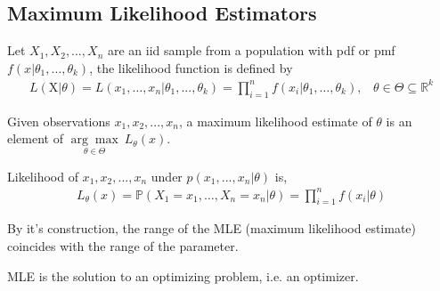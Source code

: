 \documentclass[a4paper,english,12pt]{article}
\begin{document}
\subsection{Maximum Likelihood Estimators}
Let $X_1,X_2,\dots,X_n$ are an iid sample from a population with pdf or pmf $f(x|\theta_1,\dots,\theta_k)$, the likelihood function is defined by
\begin{align}
L(\mathrm{X}|\theta)=L(x_1,\dots,x_n|\theta_1,...,\theta_k)=\prod\limits_{i=1}^n f(x_i|\theta_1,\dots,\theta_k),\,\,\,\,\,\theta \in \Theta\subseteq\mathbb{R}^k
\end{align} 
\begin{defn}{Given observations $x_1,x_2,...,x_n$, a maximum likelihood estimate of $\theta$ is an element of $\underset{\theta \in \Theta}{\arg\max} ~L_{\theta}(x)$.}
\par Likelihood of $x_1,x_2,...,x_n$ under $p(x_1,...,x_n|\theta)$ is,
\begin{align}
L_{\theta}(x) = \mathbb{P}(X_1=x_1,\dots,X_n=x_n|\theta)=\prod\limits_{i=1}^n f(x_i|\theta)
\end{align} 
\end{defn}
\begin{rem}
By it's construction, the range of the MLE (maximum likelihood estimate) coincides with the range of the parameter.
\end{rem}
\begin{rem}
MLE is the solution to an optimizing problem, i.e. an optimizer. 
\end{rem}
\end{document}

